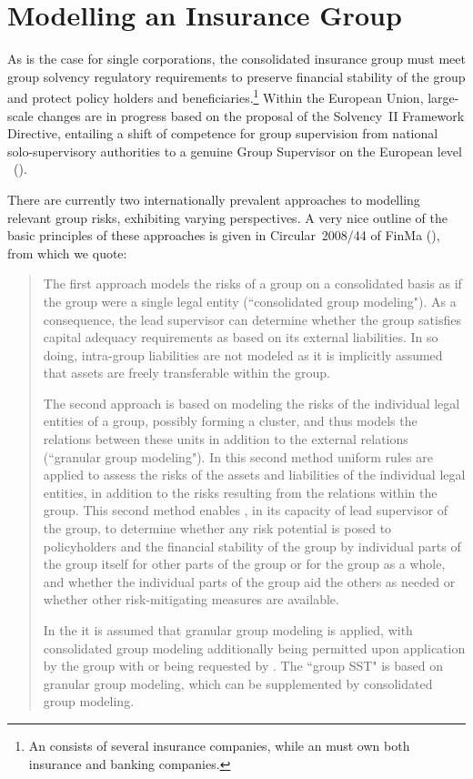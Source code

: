 \chapter{Modelling an Insurance Group}\label{chap:insuranceGroup}

As is the case for single corporations, the consolidated insurance group must meet group
solvency regulatory requirements to preserve financial stability of the group and protect
policy holders and beneficiaries.\footnote{An  consists of several
insurance companies, while an  must own both insurance and
banking companies.}
Within the European Union, large-scale changes are in progress based on the proposal of the
Solvency~II Framework Directive, entailing a shift of competence for group supervision from
national solo-supervisory authorities to a genuine Group Supervisor on the European level
~(\cite{07:CEANoteSolv2Groups,08:FinMaCircular29,08:Sehrbrock,06:FSAdiscussionPaper}).

There are currently two internationally prevalent approaches to modelling relevant group
risks, exhibiting varying perspectives. A very nice outline of the basic principles of these
approaches is given in Circular~2008/44 of FinMa (\cite{08:FinMaCircular44,08:FinMaCircular44_de}), 
from which we quote:

\begin{quote}

The first approach models the risks of a group on a consolidated basis as if the group were
a single legal entity (``consolidated group modeling"). As a consequence, the lead
supervisor can determine whether the group satisfies capital adequacy requirements as based
on its external liabilities. In so doing, intra-group liabilities are not modeled as it is
implicitly assumed that assets are freely transferable within the group.

The second approach is based on modeling the risks of the individual legal entities of a
group, possibly forming a cluster, and thus models the relations between these units in
addition to the external relations (``granular group modeling"). In this second method
uniform rules are applied to assess the risks of the assets and liabilities of the
individual legal entities, in addition to the risks resulting from the relations within the
group. This second method enables \FinMa, in its capacity of lead supervisor of the group,
to determine whether any risk potential is posed to policyholders and the financial
stability of the group by individual parts of the group itself for other parts of the group
or for the group as a whole, and whether the individual parts of the group aid the others as
needed or whether other risk-mitigating measures are available.

In the \SST{} it is assumed that granular group modeling is applied, with consolidated group
modeling additionally being permitted upon application by the group with \FINMA{} or being
requested by \FINMA{}. The ``group SST" is based on granular group modeling, which can be
supplemented by consolidated group modeling.
\end{quote}

